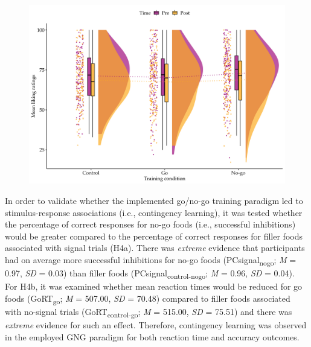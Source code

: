 \documentclass[man,floatsintext]{apa6}
\begin{document}
\begin{figure} [!htb]
\centering
\includegraphics[width=\linewidth]{figures/Figure3.png}
\label{fig:raincloud_liking}
\end{figure}

\par

In order to validate whether the implemented go/no-go training paradigm led to stimulus-response associations (i.e., contingency learning), it was tested whether the percentage of correct responses for no-go foods (i.e., successful inhibitions) would be greater compared to the percentage of correct responses for filler foods associated with signal trials (H4a). There was \emph{extreme} evidence that participants had on average more successful inhibitions for no-go foods (PCsignal\textsubscript{nogo}; \emph{M} = 0.97, \emph{SD} = 0.03) than filler foods
(PCsignal\textsubscript{control-nogo}; \emph{M} = 0.96, \emph{SD} = 0.04). For H4b, it was examined whether mean reaction times would be reduced for go foods (GoRT\textsubscript{go}; \emph{M} = 507.00, \emph{SD} = 70.48) compared to filler foods associated with no-signal trials (GoRT\textsubscript{control-go}; \emph{M} = 515.00, \emph{SD} = 75.51) and there was \emph{extreme} evidence for such an effect. Therefore, contingency learning was observed in the employed GNG paradigm for both reaction time and accuracy outcomes.
\end{document}
